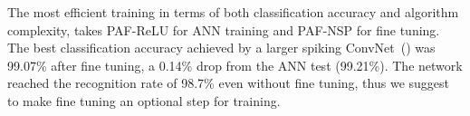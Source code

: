 
	
	
	
	The most efficient training in terms of both classification accuracy and algorithm complexity, takes PAF-ReLU for ANN training and PAF-NSP for fine tuning.
	The best classification accuracy achieved by a larger spiking ConvNet~(\DIFdelbegin {}\DIFdelend \DIFaddbegin {}\DIFaddend ) was 99.07\% after fine tuning, a 0.14\% drop from the ANN test (99.21\%).
	The network reached the recognition rate of 98.7\% even without fine tuning, thus we suggest to make fine tuning an optional step for training.

